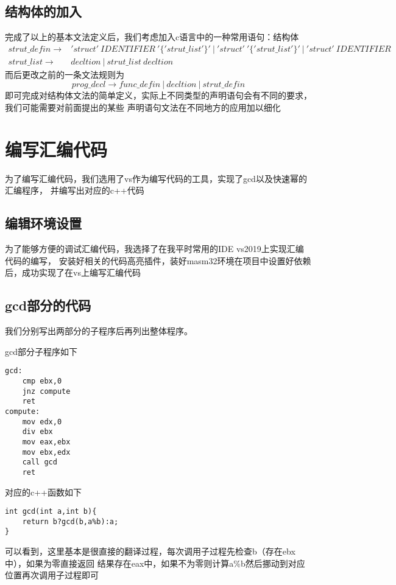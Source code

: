 \documentclass[UTF8]{ctexart}
\begin{document}
\subsection{结构体的加入}
完成了以上的基本文法定义后，我们考虑加入c语言中的一种常用语句：结构体
\begin{align*}
    strut\_defin\to & 'struct'\ IDENTIFIER\ '\{'strut\_list'\}'\ |\ 'struct'\ '\{'strut\_list'\}'\ |\ 'struct'\ IDENTIFIER\\
    strut\_list\to & decltion\ |\ strut\_list\ decltion
\end{align*}
而后更改之前的一条文法规则为
\begin{equation*}
    prog\_decl\to func\_defin\ |\ decltion\ |\ strut\_defin
\end{equation*}
即可完成对结构体文法的简单定义，实际上不同类型的声明语句会有不同的要求，我们可能需要对前面提出的某些
声明语句文法在不同地方的应用加以细化
\section{编写汇编代码}
为了编写汇编代码，我们选用了vs作为编写代码的工具，实现了gcd以及快速幂的汇编程序，
并编写出对应的c++代码
\subsection{编辑环境设置}
为了能够方便的调试汇编代码，我选择了在我平时常用的IDE vs2019上实现汇编代码的编写，
安装好相关的代码高亮插件，装好masm32环境在项目中设置好依赖后，成功实现了在vs上编写汇编代码
\subsection{gcd部分的代码}
我们分别写出两部分的子程序后再列出整体程序。

gcd部分子程序如下
\begin{verbatim}
gcd:
	cmp ebx,0
	jnz	compute
	ret	
compute:
	mov edx,0
	div ebx
	mov eax,ebx
	mov ebx,edx
	call gcd	
	ret	
\end{verbatim}
对应的c++函数如下
\begin{verbatim}    
int gcd(int a,int b){
    return b?gcd(b,a%b):a;
}
\end{verbatim}
可以看到，这里基本是很直接的翻译过程，每次调用子过程先检查b（存在ebx中），如果为零直接返回
结果存在eax中，如果不为零则计算a\%b然后挪动到对应位置再次调用子过程即可
\end{document}
